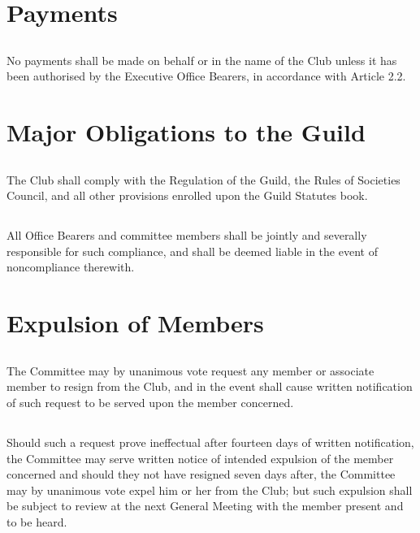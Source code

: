 \documentclass[10.5pt]{article}
\begin{document}
\section{Payments} 
\subsection{} No payments shall be made on behalf or in the name of the Club unless it has been authorised by the Executive Office Bearers, in accordance with Article 2.2.
\newline


\section{Major Obligations to the Guild}
\subsection{} The Club shall comply with the Regulation of the Guild, the Rules of Societies Council, and all other provisions enrolled upon the Guild Statutes book. 
\subsection{} All Office Bearers and committee members shall be jointly and severally responsible for such compliance, and shall be deemed liable in the event of noncompliance therewith. 
\newline


\section{Expulsion of Members}
\subsection{} The Committee may by unanimous vote request any member or associate member to resign from the Club, and in the event shall cause written notification of such request to be served upon the member concerned. 
\subsection{} Should such a request prove ineffectual after fourteen days of written notification, the Committee may serve written notice of intended expulsion of the member concerned and should they not have resigned seven days after, the Committee may by unanimous vote expel him or her from the Club; but such expulsion shall be subject to review at the next General Meeting with the member present and to be heard. 
\newline
\end{document}
